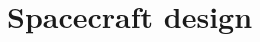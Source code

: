 \documentclass[Orbiter Developer Manual.tex]{subfiles}
\begin{document}
\section{Spacecraft design}

\end{document}
